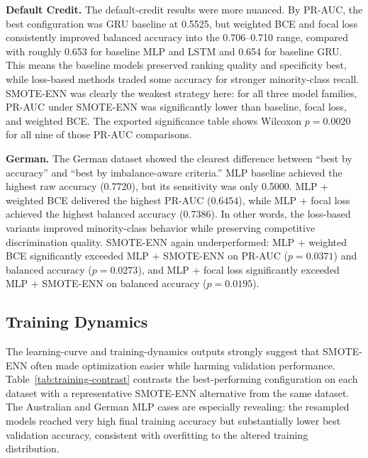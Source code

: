 \documentclass[11pt,a4paper]{article}
\begin{document}
\textbf{Default Credit.} The default-credit results were more nuanced. By PR-AUC, the best configuration was GRU baseline at 0.5525, but weighted BCE and focal loss consistently improved balanced accuracy into the 0.706--0.710 range, compared with roughly 0.653 for baseline MLP and LSTM and 0.654 for baseline GRU. This means the baseline models preserved ranking quality and specificity best, while loss-based methods traded some accuracy for stronger minority-class recall. SMOTE-ENN was clearly the weakest strategy here: for all three model families, PR-AUC under SMOTE-ENN was significantly lower than baseline, focal loss, and weighted BCE. The exported significance table shows Wilcoxon \(p = 0.0020\) for all nine of those PR-AUC comparisons.

\textbf{German.} The German dataset showed the clearest difference between ``best by accuracy'' and ``best by imbalance-aware criteria.'' MLP baseline achieved the highest raw accuracy (0.7720), but its sensitivity was only 0.5000. MLP + weighted BCE delivered the highest PR-AUC (0.6454), while MLP + focal loss achieved the highest balanced accuracy (0.7386). In other words, the loss-based variants improved minority-class behavior while preserving competitive discrimination quality. SMOTE-ENN again underperformed: MLP + weighted BCE significantly exceeded MLP + SMOTE-ENN on PR-AUC (\(p = 0.0371\)) and balanced accuracy (\(p = 0.0273\)), and MLP + focal loss significantly exceeded MLP + SMOTE-ENN on balanced accuracy (\(p = 0.0195\)).

\subsection*{Training Dynamics}
The learning-curve and training-dynamics outputs strongly suggest that SMOTE-ENN often made optimization easier while harming validation performance. Table~\ref{tab:training-contrast} contrasts the best-performing configuration on each dataset with a representative SMOTE-ENN alternative from the same dataset. The Australian and German MLP cases are especially revealing: the resampled models reached very high final training accuracy but substantially lower best validation accuracy, consistent with overfitting to the altered training distribution.
\end{document}
